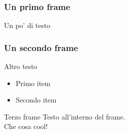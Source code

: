 \documentclass{beamer}
\begin{document}
\begin{frame}
    \frametitle{Un primo frame}
    Un po' di testo
\end{frame}

\begin{frame}
    \frametitle{Un secondo frame}
    Altro testo
    \begin{itemize}
        \item<1-> Primo item
        \item<2-> Secondo item
    \end{itemize}
\end{frame}

\begin{frame}{Terzo frame}
    Testo all'interno del frame.\\
    Che cosa cool!
\end{frame}
\end{document}

